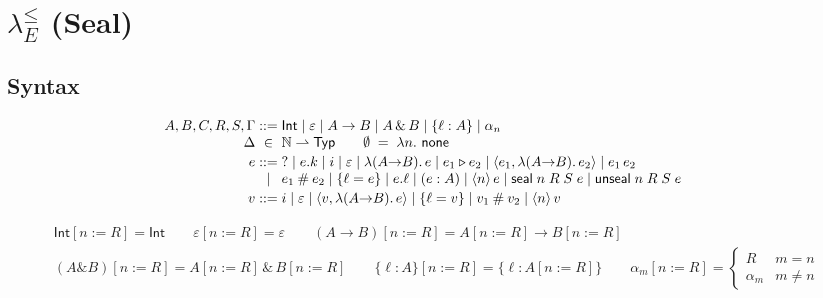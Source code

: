 \documentclass[10pt]{article}
\newcommand{\Int}{\mathsf{Int}}
\newcommand{\tp}{\varepsilon}
\newcommand{\bra}[1]{\alpha_{#1}}
\newcommand{\mrg}{\mathbin{\#}}
\newcommand{\qry}{{?}}
\newcommand{\bx}{\mathbin{\triangleright}}
\newcommand{\subs}[3]{#1[#2{:=}#3]}
\newcommand{\wrp}[2]{\langle #1\rangle\,#2}
\newcommand{\sealE}[4]{\mathsf{seal}\;#1\;#2\;#3\;#4}
\newcommand{\unsealE}[4]{\mathsf{unseal}\;#1\;#2\;#3\;#4}
\newcommand{\lk}[3]{#1 \ni_{#2} #3}
\newcommand{\rlk}[3]{#2\,{:}\,#3 \in #1}
\newcommand{\lin}[2]{#1 \in #2}
\begin{document}
\section{$\lambda_E^{\leq}$ (Seal)}

\subsection{Syntax}

\[
\begin{array}{r@{\;}c@{\;}l@{\qquad}l}
A,B,C,R,S,\Gamma &::=& \Int \mid \tp \mid A \to B \mid A \,\&\, B \mid \{\ell : A\} \mid \bra{n} & \\
\Delta &\in& \mathbb{N} \rightharpoonup \mathsf{Typ} \qquad \emptyset \;=\; \lambda n.\ \mathsf{none} & \\[2pt]
e &::=& \qry \mid e.k \mid i \mid \tp \mid \lambda(A{\to}B).\,e \mid e_1 \bx e_2 \mid \langle e_1, \lambda(A{\to}B).\,e_2\rangle \mid e_1\,e_2 & \\
  &\mid& e_1 \mrg e_2 \mid \{\ell = e\} \mid e.\ell \mid (e : A) \mid \wrp{n}{e} \mid \sealE{n}{R}{S}{e} \mid \unsealE{n}{R}{S}{e} & \\[2pt]
v &::=& i \mid \tp \mid \langle v, \lambda(A{\to}B).\,e\rangle \mid \{\ell = v\} \mid v_1 \mrg v_2 \mid \wrp{n}{v} &
\end{array}
\]

\[
\begin{array}{l}
\subs{\Int}{n}{R} = \Int \qquad
\subs{\tp}{n}{R} = \tp \qquad
\subs{(A \to B)}{n}{R} = \subs{A}{n}{R} \to \subs{B}{n}{R} \\
\subs{(A \& B)}{n}{R} = \subs{A}{n}{R} \,\&\, \subs{B}{n}{R} \qquad
\subs{\{\ell : A\}}{n}{R} = \{\ell : \subs{A}{n}{R}\} \qquad
\subs{\bra{m}}{n}{R} = \begin{cases} R & m = n \\ \bra{m} & m \neq n\end{cases}
\end{array}
\]

\end{document}
